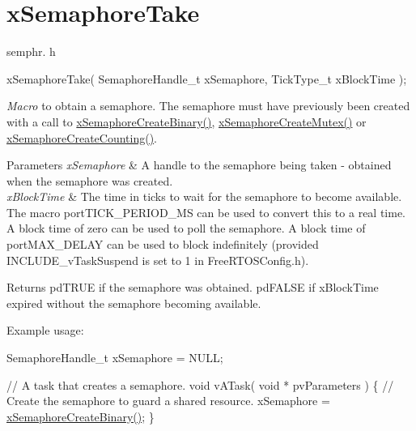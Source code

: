 \hypertarget{group__x_semaphore_take}{}\section{x\+Semaphore\+Take}
\label{group__x_semaphore_take}
semphr. h 
\begin{DoxyPre}
xSemaphoreTake(
                  SemaphoreHandle\_t xSemaphore,
                  TickType\_t xBlockTime
              );
\end{DoxyPre}


{\itshape Macro} to obtain a semaphore. The semaphore must have previously been created with a call to \hyperlink{vendor_2ceedling_2plugins_2freertos_2src_2freertos_2include_2semphr_8h_acba963695e4f159d9bfa2394cae5badc}{x\+Semaphore\+Create\+Binary()}, \hyperlink{vendor_2ceedling_2plugins_2freertos_2src_2freertos_2include_2semphr_8h_aa6a00aa9b91a9e5b3ebe4ae1c3f115c6}{x\+Semaphore\+Create\+Mutex()} or \hyperlink{vendor_2ceedling_2plugins_2freertos_2src_2freertos_2include_2semphr_8h_a7764616a918a46115403569a88148ad4}{x\+Semaphore\+Create\+Counting()}.


\begin{DoxyParams}{Parameters}
{\em x\+Semaphore} & A handle to the semaphore being taken -\/ obtained when the semaphore was created.\\
\hline
{\em x\+Block\+Time} & The time in ticks to wait for the semaphore to become available. The macro port\+T\+I\+C\+K\+\_\+\+P\+E\+R\+I\+O\+D\+\_\+\+MS can be used to convert this to a real time. A block time of zero can be used to poll the semaphore. A block time of port\+M\+A\+X\+\_\+\+D\+E\+L\+AY can be used to block indefinitely (provided I\+N\+C\+L\+U\+D\+E\+\_\+v\+Task\+Suspend is set to 1 in Free\+R\+T\+O\+S\+Config.\+h).\\
\hline
\end{DoxyParams}
\begin{DoxyReturn}{Returns}
pd\+T\+R\+UE if the semaphore was obtained. pd\+F\+A\+L\+SE if x\+Block\+Time expired without the semaphore becoming available.
\end{DoxyReturn}
Example usage\+: 
\begin{DoxyPre}
SemaphoreHandle\_t xSemaphore = NULL;\end{DoxyPre}



\begin{DoxyPre}// A task that creates a semaphore.
void vATask( void * pvParameters )
\{
 // Create the semaphore to guard a shared resource.
 xSemaphore = \hyperlink{vendor_2ceedling_2plugins_2freertos_2src_2freertos_2include_2semphr_8h_acba963695e4f159d9bfa2394cae5badc}{xSemaphoreCreateBinary()};
\}\end{DoxyPre}



